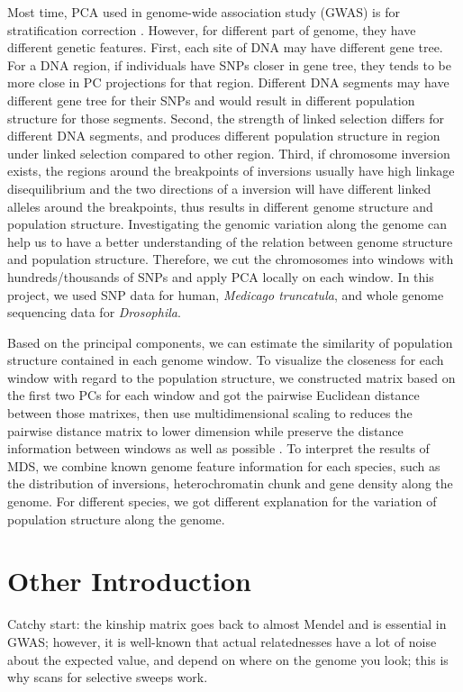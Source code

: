 \documentclass[11pt, oneside]{article}   	%
\begin{document}
\noindent  Most time, PCA used in genome-wide association study (GWAS) is for stratification correction \cite{key7}. However, for different part of genome, they have different genetic features. First, each site of DNA may have different gene tree. For a DNA region, if individuals have SNPs closer in gene tree, they tends to be more close in PC projections for that region. Different DNA segments may have different gene tree for their SNPs and would result in different population structure for those segments. Second, the strength of linked selection differs for different DNA segments, and produces different population structure in region under linked selection compared to other region. Third, if chromosome inversion exists, the regions around the breakpoints of inversions usually have high linkage disequilibrium and the two directions of a inversion will have different linked alleles around the breakpoints, thus results in different genome structure and population structure. Investigating the genomic variation along the genome can help us to have a better understanding of the relation between genome structure and population structure. Therefore, we cut the chromosomes into windows with hundreds/thousands of SNPs and apply PCA locally on each window. In this project, we used SNP data for human, \textit{Medicago truncatula}, and whole genome sequencing data for \textit{Drosophila}.

\noindent Based on the principal components, we can estimate the similarity of population structure contained in each genome window. To visualize the closeness for each window with regard to the population structure, we constructed matrix based on the first two PCs for each window and got the pairwise Euclidean distance between those matrixes, then use multidimensional scaling to reduces the pairwise distance matrix to lower dimension while preserve the distance information between windows as well as possible \cite{key5}. To interpret the results of MDS, we combine known genome feature information for each species, such as the distribution of inversions, heterochromatin chunk and gene density along the genome. For different species, we got different explanation for the variation of population structure along the genome.

\section{Other Introduction}


Catchy start: the kinship matrix goes back to almost Mendel and is essential in GWAS;
however, it is well-known that actual relatednesses have a lot of noise about the expected value,
and depend on where on the genome you look;
this is why scans for selective sweeps work.
\end{document}
